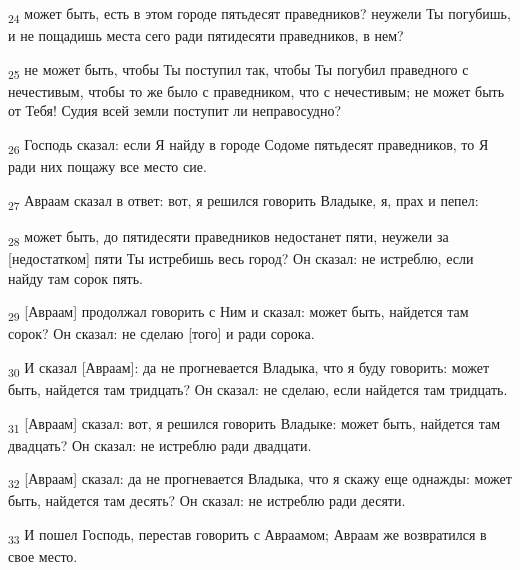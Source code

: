\begin{tcolorbox}
\textsubscript{24} может быть, есть в этом городе пятьдесят праведников? неужели Ты погубишь, и не пощадишь места сего ради пятидесяти праведников, в нем?
\end{tcolorbox}
\begin{tcolorbox}
\textsubscript{25} не может быть, чтобы Ты поступил так, чтобы Ты погубил праведного с нечестивым, чтобы то же было с праведником, что с нечестивым; не может быть от Тебя! Судия всей земли поступит ли неправосудно?
\end{tcolorbox}
\begin{tcolorbox}
\textsubscript{26} Господь сказал: если Я найду в городе Содоме пятьдесят праведников, то Я ради них пощажу все место сие.
\end{tcolorbox}
\begin{tcolorbox}
\textsubscript{27} Авраам сказал в ответ: вот, я решился говорить Владыке, я, прах и пепел:
\end{tcolorbox}
\begin{tcolorbox}
\textsubscript{28} может быть, до пятидесяти праведников недостанет пяти, неужели за [недостатком] пяти Ты истребишь весь город? Он сказал: не истреблю, если найду там сорок пять.
\end{tcolorbox}
\begin{tcolorbox}
\textsubscript{29} [Авраам] продолжал говорить с Ним и сказал: может быть, найдется там сорок? Он сказал: не сделаю [того] и ради сорока.
\end{tcolorbox}
\begin{tcolorbox}
\textsubscript{30} И сказал [Авраам]: да не прогневается Владыка, что я буду говорить: может быть, найдется там тридцать? Он сказал: не сделаю, если найдется там тридцать.
\end{tcolorbox}
\begin{tcolorbox}
\textsubscript{31} [Авраам] сказал: вот, я решился говорить Владыке: может быть, найдется там двадцать? Он сказал: не истреблю ради двадцати.
\end{tcolorbox}
\begin{tcolorbox}
\textsubscript{32} [Авраам] сказал: да не прогневается Владыка, что я скажу еще однажды: может быть, найдется там десять? Он сказал: не истреблю ради десяти.
\end{tcolorbox}
\begin{tcolorbox}
\textsubscript{33} И пошел Господь, перестав говорить с Авраамом; Авраам же возвратился в свое место.
\end{tcolorbox}
